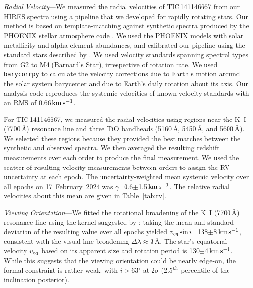 \documentclass[11pt,twocolumn,tighten,linenumbers]{aastex7}
\newcommand{\kms}{\ensuremath{\rm km\,s^{-1}}}
\begin{document}
{\it Radial Velocity}---We measured the radial velocities of
TIC\,141146667 from our HIRES spectra using a pipeline that we
developed for rapidly rotating stars.  Our method is based on
template-matching against synthetic spectra produced by the PHOENIX
stellar atmosphere code \citep{Husser2013}.  We used the PHOENIX models
with solar metallicity and alpha element abundances, and calibrated
our pipeline using the standard stars described by \citet{Chubak2012}.
We used velocity standards spanning spectral types from G2 to M4
(Barnard's Star), irrespective of rotation rate.  We used
\texttt{barycorrpy} \citep{Kanodia2018} to calculate the velocity
corrections due to Earth's motion around the solar system barycenter
and due to Earth's daily rotation about its axis.  Our analysis code
reproduces the systemic velocities of known velocity standards
\citep{Chubak2012} with an RMS of 0.66\,\kms.

For TIC\,141146667, we measured the radial velocities using regions
near the K~I (7700\,\AA) resonance line and three TiO bandheads
(5160\,\AA, 5450\,\AA, and 5600\,\AA).  We selected these regions
because they provided the best matches between the synthetic and
observed spectra.  We then averaged the resulting redshift
measurements over each order to produce the final measurement.  We
used the scatter of resulting velocity measurements between orders to
assign the RV uncertainty at each epoch.  The uncertainty-weighted
mean systemic velocity over all epochs on 17~February~2024 was
$\gamma$=0.6$\pm$1.5\,\kms.  The relative radial velocities about this
mean are given in Table~\ref{tab:rv}.

{\it Viewing Orientation}---We fitted the rotational broadening of the
K~I (7700\,\AA) resonance line using the kernel suggested by
\citet{Gray2008}; taking the mean and standard deviation of the
resulting value over all epochs yielded $v_{\rm eq} \sin
i$=138$\pm$8\,\kms, consistent with the visual line broadening $\Delta
\lambda$$\approx$3\,\AA.  The star's equatorial velocity $v_{\rm eq}$
based on its apparent size and rotation period is 130$\pm$4\,\kms.
While this suggests that the viewing orientation could be nearly
edge-on, the formal constraint is rather weak, with $i$$>$63$^\circ$
at 2$\sigma$ (2.5$^{\rm th}$ percentile of the inclination posterior).

\end{document}
